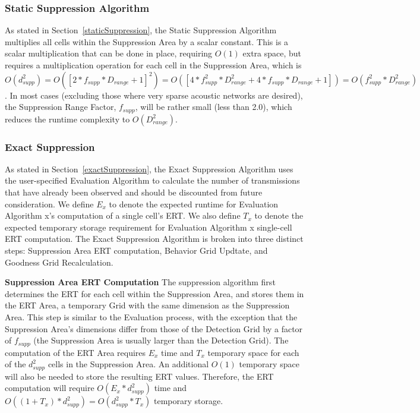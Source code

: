 \subsubsection{Static Suppression Algorithm}
As stated in Section~\ref{staticSuppression}, the Static Suppression Algorithm multiplies all cells within the Suppression Area by a scalar constant.  This is a scalar multiplication that can be done in place, requiring $O(1)$ extra space, but requires a multiplication operation for each cell in the Suppression Area, which is $O(d_{supp} ^2) = O([2*f_{supp}*D_{range} + 1]^2) = O([4*f_{supp}^2*D_{range}^2 + 4*f_{supp}*D_{range} + 1]) = O(f_{supp}^2*D_{range}^2)$.  In most cases (excluding those where very sparse acoustic networks are desired), the Suppression Range Factor, $f_{supp}$, will be rather small (less than 2.0), which reduces the runtime complexity to $O(D_{range}^2)$.

\subsubsection{Exact Suppression}
As stated in Section~\ref{exactSuppression}, the Exact Suppression Algorithm uses the user-specified Evaluation Algorithm to calculate the number of transmissions that have already been observed and should be discounted from future consideration.  We define $E_{x}$ to denote the expected runtime for Evaluation Algorithm x's computation of a single cell's ERT.  We also define $T_{x}$ to denote the expected temporary storage requirement for Evaluation Algorithm x single-cell ERT computation.  The Exact Suppression Algorithm is broken into three distinct steps: Suppression Area ERT computation, Behavior Grid Updtate, and Goodness Grid Recalculation.
\newline

\textbf{Suppression Area ERT Computation}\newline
The suppression algorithm first determines the ERT for each cell within the Suppression Area, and stores them in the ERT Area, a temporary Grid with the same dimension as the Suppression Area.  This step is similar to the Evaluation process, with the exception that the Suppression Area's dimensions differ from those of the Detection Grid by a factor of $f_{supp}$ (the Suppression Area is usually larger than the Detection Grid).  The computation of the ERT Area requires $E_{x}$ time and  $T_x$ temporary space for each of the $d_{supp}^2$ cells in the Suppression Area.  An additional  $O(1)$ temporary space will also be needed to store the resulting ERT values.  Therefore, the ERT computation will require $O(E_{x} * d_{supp}^2)$ time and $O((1 + T_x)* d_{supp}^2) = O(d_{supp}^2 * T_x)$ temporary storage.

